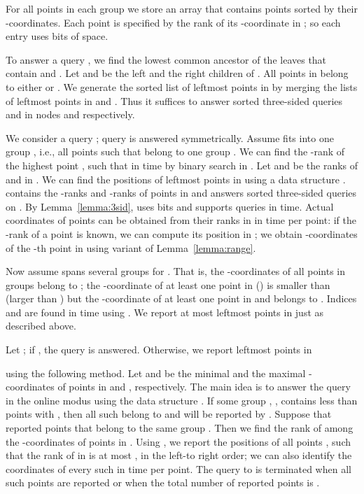 \documentclass[11pt]{article}
\newcommand{\no}[1]{}
\begin{document}
For all points in each group  we store an array  that
contains  points sorted by their -coordinates.  Each point is
specified by the rank of its -coordinate in ; so each
entry uses  bits of space.
\no{
We answer a two-dimensional query by answering two three-sided 
queries in the online modus. Data structures  are main 
tools for answering relevant three-sided queries. We also use 
the structures for single groups 
}

To answer a query , we find the lowest common
ancestor  of the leaves that contain  and .  Let  and
 be the left and the right children of .  All points in
 belong to either  or
.  We generate the sorted list of 
leftmost points in  by merging the lists of  leftmost
points in  and . Thus it suffices to answer sorted three-sided
queries  and  in nodes
 and  respectively.

We consider a query ; query  is answered symmetrically. Assume
 fits into one group , i.e., all points  such that
 belong to one group .  We can find the
-rank  of the highest point , such that  in  time by binary search in .  Let 
and  be the ranks of  and  in .  We can find the
positions of  leftmost points in  using a data structure .
 contains the -ranks and -ranks of points in  
and answers sorted three-sided queries on . 
By Lemma~\ref{lemma:3sid},  uses  bits 
and supports  queries in  time.
 Actual coordinates of points can be obtained from their ranks in  in   time per point: if the -rank of a point 
is known, we can compute its position in ; we obtain 
-coordinates of the -th point in  using variant 
 of Lemma~\ref{lemma:range}.

Now assume  spans several groups 
for . That is, the -coordinates of all points in groups
 belong to ; the
-coordinate of at least one point in  () is
smaller than  (larger than ) but the -coordinate of at least
one point in  and  belongs to . Indices  and 
 are found in  time using .  We report
at most  leftmost points in 
just as described above.

 
Let ; if , the query
is answered. Otherwise, we report  leftmost points in

using the following method.  Let  and  be the minimal and
the maximal -coordinates of points in  and
, respectively.  The main idea is to answer the query
 in the online modus using the data structure
. If some group , , contains less than  points  with , then all such  belong to
 and will be reported by .  Suppose that 
reported  points that belong to the same group
. Then we find the rank  of  among the
-coordinates of points in . Using , we report
the positions of all points , such that the rank of
 in  is at most , in the left-to right order; we can
also identify the coordinates of every such  in  time per point.
The query to  is terminated when all such points are
reported or when the total number of reported points is .
\end{document}
